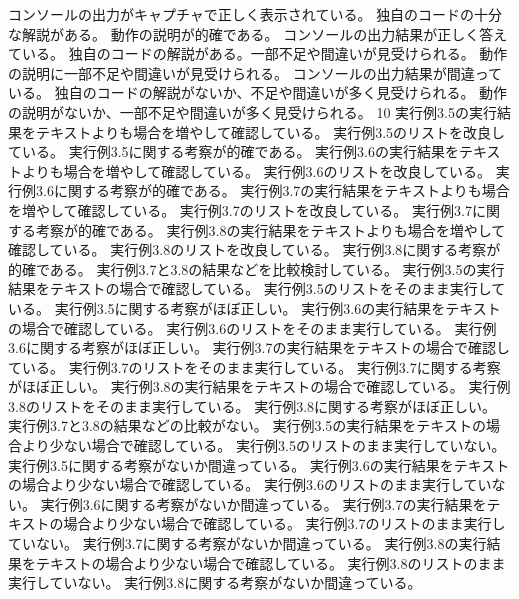 {{  {コンソールの出力がキャプチャで正しく表示されている。}
	{独自のコードの十分な解説がある。}
	{動作の説明が的確である。}
	}
	{
  {コンソールの出力結果が正しく答えている。}
	{独自のコードの解説がある。一部不足や間違いが見受けられる。}
	{動作の説明に一部不足や間違いが見受けられる。}
	}
	{
  {コンソールの出力結果が間違っている。}
	{独自のコードの解説がないか、不足や間違いが多く見受けられる。}
	{動作の説明がないか、一部不足や間違いが多く見受けられる。}
	}
{}{10}{
  {実行例3.5の実行結果をテキストよりも場合を増やして確認している。}
  {実行例3.5のリストを改良している。}
  {実行例3.5に関する考察が的確である。}
  {実行例3.6の実行結果をテキストよりも場合を増やして確認している。}
  {実行例3.6のリストを改良している。}
  {実行例3.6に関する考察が的確である。}
  {実行例3.7の実行結果をテキストよりも場合を増やして確認している。}
  {実行例3.7のリストを改良している。}
  {実行例3.7に関する考察が的確である。}
  {実行例3.8の実行結果をテキストよりも場合を増やして確認している。}
  {実行例3.8のリストを改良している。}
  {実行例3.8に関する考察が的確である。}
  {実行例3.7と3.8の結果などを比較検討している。}
	}
	{
  {実行例3.5の実行結果をテキストの場合で確認している。}
  {実行例3.5のリストをそのまま実行している。}
  {実行例3.5に関する考察がほぼ正しい。}
  {実行例3.6の実行結果をテキストの場合で確認している。}
  {実行例3.6のリストをそのまま実行している。}
  {実行例3.6に関する考察がほぼ正しい。}
  {実行例3.7の実行結果をテキストの場合で確認している。}
  {実行例3.7のリストをそのまま実行している。}
  {実行例3.7に関する考察がほぼ正しい。}
  {実行例3.8の実行結果をテキストの場合で確認している。}
  {実行例3.8のリストをそのまま実行している。}
  {実行例3.8に関する考察がほぼ正しい。}
  {実行例3.7と3.8の結果などの比較がない。}
	}
	{
  {実行例3.5の実行結果をテキストの場合より少ない場合で確認している。}
  {実行例3.5のリストのまま実行していない。}
  {実行例3.5に関する考察がないか間違っている。}
  {実行例3.6の実行結果をテキストの場合より少ない場合で確認している。}
  {実行例3.6のリストのまま実行していない。}
  {実行例3.6に関する考察がないか間違っている。}
  {実行例3.7の実行結果をテキストの場合より少ない場合で確認している。}
  {実行例3.7のリストのまま実行していない。}
  {実行例3.7に関する考察がないか間違っている。}
  {実行例3.8の実行結果をテキストの場合より少ない場合で確認している。}
  {実行例3.8のリストのまま実行していない。}
  {実行例3.8に関する考察がないか間違っている。}
	}
}